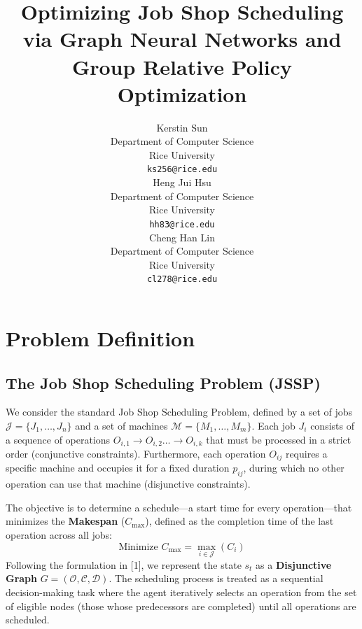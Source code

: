 \documentclass{article}
\title{Optimizing Job Shop Scheduling via Graph Neural Networks and Group Relative Policy Optimization}
\author{%
  Kerstin Sun \\
  Department of Computer Science\\
  Rice University\\
  \texttt{ks256@rice.edu} \\
  \And
  Heng Jui Hsu \\
  Department of Computer Science\\
  Rice University\\
  \texttt{hh83@rice.edu} \\
  \And
  Cheng Han Lin \\
  Department of Computer Science\\
  Rice University\\
  \texttt{cl278@rice.edu} \\
}
\begin{document}
\maketitle


\section{Problem Definition}

\subsection{The Job Shop Scheduling Problem (JSSP)}
We consider the standard Job Shop Scheduling Problem, defined by a set of jobs $\mathcal{J} = \{J_1, \dots, J_n\}$ and a set of machines $\mathcal{M} = \{M_1, \dots, M_m\}$. Each job $J_i$ consists of a sequence of operations $O_{i,1} \to O_{i,2} \dots \to O_{i,k}$ that must be processed in a strict order (conjunctive constraints). Furthermore, each operation $O_{ij}$ requires a specific machine and occupies it for a fixed duration $p_{ij}$, during which no other operation can use that machine (disjunctive constraints).

The objective is to determine a schedule—a start time for every operation—that minimizes the \textbf{Makespan} ($C_{\max}$), defined as the completion time of the last operation across all jobs:
\begin{equation}
    \text{Minimize } C_{\max} = \max_{i \in \mathcal{J}} (C_i)
\end{equation}
Following the formulation in [1], we represent the state $s_t$ as a \textbf{Disjunctive Graph} $G = (\mathcal{O}, \mathcal{C}, \mathcal{D})$. The scheduling process is treated as a sequential decision-making task where the agent iteratively selects an operation from the set of eligible nodes (those whose predecessors are completed) until all operations are scheduled.
\end{document}
